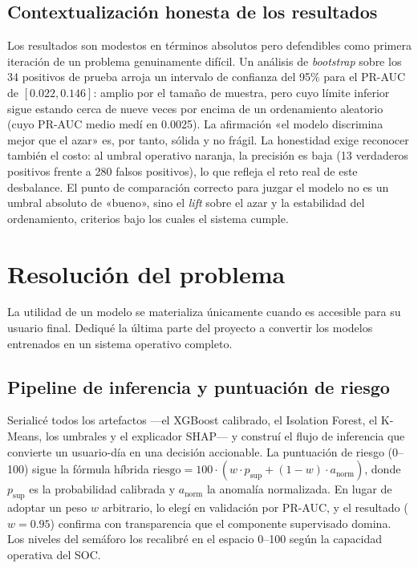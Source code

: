 \documentclass[12pt, a4paper]{article}
\begin{document}
\subsection{Contextualización honesta de los resultados}

Los resultados son modestos en términos absolutos pero defendibles como primera iteración de un
problema genuinamente difícil. Un análisis de \textit{bootstrap} sobre los 34 positivos de prueba
arroja un intervalo de confianza del 95\% para el PR-AUC de $[0.022, 0.146]$: amplio por el tamaño de
muestra, pero cuyo límite inferior sigue estando cerca de nueve veces por encima de un ordenamiento
aleatorio (cuyo PR-AUC medio medí en 0.0025). La afirmación «el modelo discrimina mejor que el azar»
es, por tanto, sólida y no frágil. La honestidad exige reconocer también el costo: al umbral operativo
naranja, la precisión es baja (13 verdaderos positivos frente a 280 falsos positivos), lo que refleja
el reto real de este desbalance. El punto de comparación correcto para juzgar el modelo no es un
umbral absoluto de «bueno», sino el \textit{lift} sobre el azar y la estabilidad del ordenamiento,
criterios bajo los cuales el sistema cumple.

\section{Resolución del problema}

La utilidad de un modelo se materializa únicamente cuando es accesible para su usuario final. Dediqué
la última parte del proyecto a convertir los modelos entrenados en un sistema operativo completo.

\subsection{Pipeline de inferencia y puntuación de riesgo}

Serialicé todos los artefactos ---el XGBoost calibrado, el Isolation Forest, el K-Means, los umbrales
y el explicador SHAP--- y construí el flujo de inferencia que convierte un usuario-día en una
decisión accionable. La puntuación de riesgo (0--100) sigue la fórmula híbrida
$\text{riesgo} = 100 \cdot (w \cdot p_{\text{sup}} + (1-w)\cdot a_{\text{norm}})$, donde $p_{\text{sup}}$
es la probabilidad calibrada y $a_{\text{norm}}$ la anomalía normalizada. En lugar de adoptar un peso
$w$ arbitrario, lo elegí en validación por PR-AUC, y el resultado ($w = 0.95$) confirma con
transparencia que el componente supervisado domina. Los niveles del semáforo los recalibré en el
espacio 0--100 según la capacidad operativa del SOC.
\end{document}
